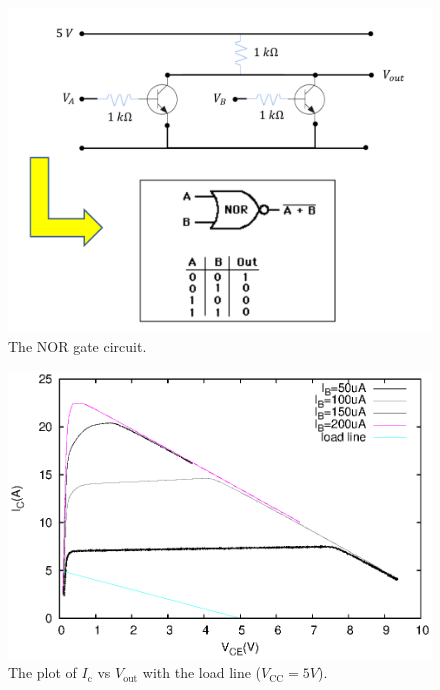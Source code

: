 \documentclass[11pt]{article}
\begin{document}
\begin{figure}[H]
 \begin{center}
  \includegraphics[width=\linewidth/2]{act4figure}
  \caption{The NOR gate circuit.}
  \label{fig:act4figure}
 \end{center}
\end{figure}

\begin{figure}[H]
 \begin{center}
  \includegraphics[width=\linewidth/1]{act4ll}
  \caption{The plot of $I_{\mathrm{c}}$ vs $V_{\mathrm{out}}$ with the load line ($V_{\mathrm{CC}}=5V$).}
  \label{fig:act4ll}
 \end{center}
\end{figure}
\end{document}
